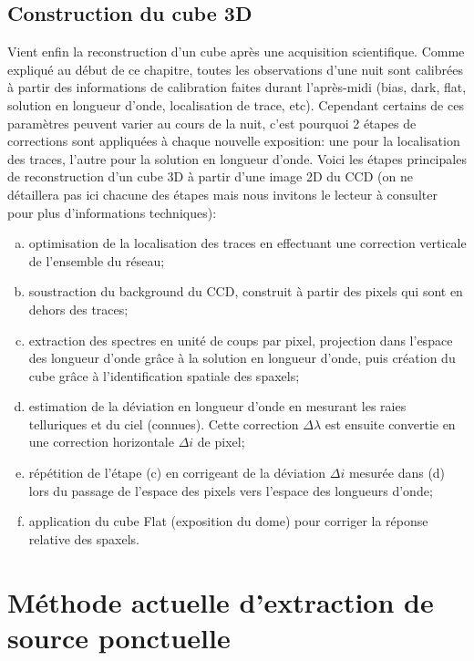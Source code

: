 \documentclass[../main/main.tex]{subfiles}
\begin{document}
\subsection{Construction du cube 3D}\label{ssec:3dcubecons}
Vient enfin la reconstruction d'un cube après une acquisition
scientifique. Comme expliqué au début de ce chapitre,
toutes les observations d'une nuit sont calibrées 
à partir des informations de calibration faites durant l'après-midi
(bias, dark, flat, solution en longueur d'onde, localisation de trace,
etc).
Cependant certains de ces paramètres peuvent varier au cours de la nuit,
c'est pourquoi 2 étapes de corrections sont appliquées à chaque nouvelle
exposition: une pour la localisation des traces, l'autre pour la
solution en longueur d'onde. Voici les étapes principales de
reconstruction d'un cube 3D à partir d'une image 2D du CCD (on ne
détaillera pas ici chacune des étapes mais nous invitons le lecteur à
consulter \citet{pysedm} pour plus d'informations techniques):

\begin{enumerate}[(a)]
\itemsep=0em
\item optimisation de la localisation des traces en effectuant une
  correction verticale de l'ensemble du réseau;
\item soustraction du background du CCD, construit à partir des pixels
  qui sont en dehors des traces;
\item extraction des spectres en unité de coups par pixel, projection dans
  l'espace des longueur d'onde grâce à la solution en longueur d'onde,
  puis création du cube grâce à l'identification spatiale des spaxels;
\item estimation de la déviation en longueur d'onde en mesurant les
  raies telluriques et du ciel (connues). Cette correction
  $\Delta\lambda$ est ensuite convertie en une correction horizontale
  $\Delta i$ de pixel;
\item répétition de l'étape (c) en corrigeant de la déviation $\Delta i$
  mesurée dans (d) lors du passage de l'espace des pixels vers l'espace
  des longueurs d'onde;
\item application du cube Flat (exposition du dome) pour corriger la réponse relative des spaxels.
\end{enumerate}

\section{Méthode actuelle d'extraction de source ponctuelle}
\label{ssec:pysedmextractstar}
\end{document}
